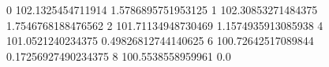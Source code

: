 0 102.1325454711914 1.5786895751953125
1 102.30853271484375 1.7546768188476562
2 101.71134948730469 1.1574935913085938
4 101.0521240234375 0.49826812744140625
6 100.72642517089844 0.17256927490234375
8 100.5538558959961 0.0
